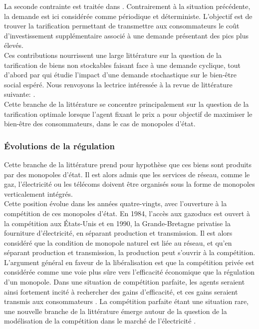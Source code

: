 La seconde contrainte est traitée dans \cite{boiteux1960peak}. Contrairement à la situation précédente, la demande est ici considérée comme périodique et déterministe. L'objectif est de trouver la tarification permettant de transmettre aux consommateurs le coût d'investissement supplémentaire associé à une demande présentant des pics plus élevés.\\

Ces contributions nourrissent une large littérature sur la question de la tarification de biens non stockables faisant face à une demande cyclique, tout d'abord par \cite{brown1969public} qui étudie l'impact d'une demande stochastique sur le bien-être social espéré. Nous renvoyons la lectrice intéressée à la revue de littérature suivante: \cite{crew1995theory}.\\

Cette branche de la littérature se concentre principalement sur la question de la tarification optimale lorsque l'agent fixant le prix a pour objectif de maximiser le bien-être des consommateurs, dans le cas de monopoles d'état.\\

\subsubsection*{Évolutions de la régulation}
Cette branche de la littérature prend pour hypothèse que ces biens sont produits par des monopoles d'état. Il est alors admis que les services de réseau, comme le gaz, l'électricité ou les télécoms doivent être organisés sous la forme de monopoles verticalement intégrés.\\

Cette position évolue dans les années quatre-vingts, avec l'ouverture à la compétition de ces monopoles d'état. En 1984, l'accès aux gazoducs est ouvert à la compétition aux États-Unis et en 1990, la Grande-Bretagne privatise la fourniture d'électricité, en séparant production et transmission. Il est alors considéré que la condition de monopole naturel est liée au réseau, et qu'en séparant production et transmission, la production peut s'ouvrir à la compétition.\\

L'argument général en faveur de la libéralisation est que la compétition privée est considérée comme une voie plus sûre vers l'efficacité économique que la régulation d'un monopole. Dans une situation de compétition parfaite, les agents seraient ainsi fortement incité à rechercher des gains d'efficacité, et ces gains seraient transmis aux consommateurs \cite{schmidt1996costs}. La compétition parfaite étant une situation rare, une nouvelle branche de la littérature émerge autour de la question de la modélisation de la compétition dans le marché de l'électricité \cite{newbery1997privatisation}. \\

